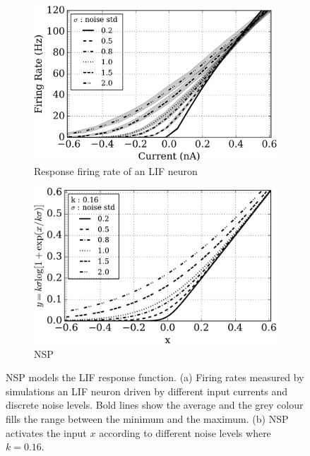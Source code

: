 	\begin{figure}[thb!]
		\centering
		\begin{subfigure}[t]{0.48\textwidth}
			\includegraphics[width=\textwidth]{pics_iconip/siegert.png}
			\caption{Response firing rate of an LIF neuron}
		\end{subfigure}
		\begin{subfigure}[t]{0.48\textwidth}
			\includegraphics[width=\textwidth]{pics_iconip/4.pdf}
			\caption{NSP}
		\end{subfigure}
		\caption{
			NSP models the LIF response function.
			(a) Firing rates measured by simulations \DIFdelbeginFL {}\DIFdelendFL \DIFaddbeginFL {}\DIFaddendFL an LIF neuron driven by different input currents and discrete noise levels.
			Bold lines show the average and the grey colour fills the range between the minimum and the maximum.
			(b) NSP activates the input $x$ according to different noise levels where $k=0.16$.}
		\label{fig:nsp}
	\end{figure}

